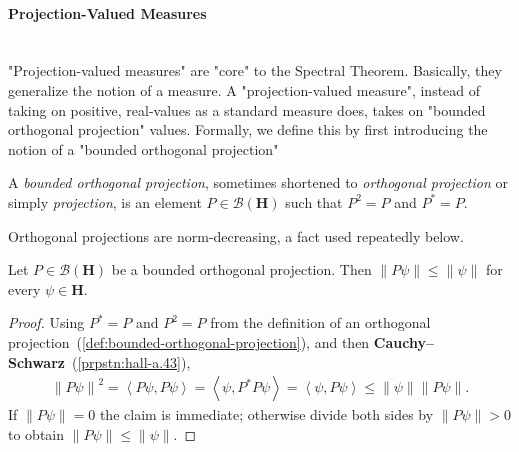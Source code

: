 \paragraph{Projection-Valued Measures}\mbox{}\\
"Projection-valued measures" are "core" to the Spectral Theorem. Basically, they generalize the notion of a measure. A "projection-valued measure", instead of taking on positive, real-values as a standard measure does, takes on "bounded orthogonal projection" values. Formally, we define this by first introducing the notion of a "bounded orthogonal projection"

\begin{definition}
    \label{def:bounded-orthogonal-projection}
    \leanok
    A \textit{bounded orthogonal projection}, sometimes shortened to \textit{orthogonal projection} or simply \textit{projection}, is an element $P \in \mathcal{B}(\mathbf{H})$ such that $P^2 = P$ and $P^* = P$.
\end{definition}

Orthogonal projections are norm-decreasing, a fact used repeatedly below.

\begin{lemma}
    \label{lmm:projection-norm-decreasing}
    \leanok
    Let $P \in \mathcal{B}(\mathbf{H})$ be a bounded orthogonal projection. Then $\left\| P\psi \right\| \le \left\| \psi \right\|$ for every $\psi \in \mathbf{H}$.
\end{lemma}
\begin{proof}
    \leanok
Using $P^* = P$ and $P^2 = P$ from the definition of an orthogonal projection~(\ref{def:bounded-orthogonal-projection}), and then \textbf{Cauchy–Schwarz}~(\ref{prpstn:hall-a.43}),
\begin{align}
    \left\| P\psi \right\|^2 = \left< P\psi, P\psi \right> = \left< \psi, P^*P\psi \right> = \left< \psi, P\psi \right> \le \left\| \psi \right\| \left\| P\psi \right\|.
\end{align}
If $\left\| P\psi \right\| = 0$ the claim is immediate; otherwise divide both sides by $\left\| P\psi \right\| > 0$ to obtain $\left\| P\psi \right\| \le \left\| \psi \right\|$.
\end{proof}

